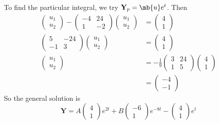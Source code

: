 \documentclass[a4paper]{article}
\begin{document}
\begin{eg}
      To find the particular integral, we try $\mathbf{Y}_p = \mb{u}e^t$. Then
      \begin{align*}
        \begin{pmatrix}
          u_1\\u_2
        \end{pmatrix} - 
        \begin{pmatrix}
          -4 & 24\\
          1 & -2
        \end{pmatrix}
        \begin{pmatrix}
          u_1\\u_2
        \end{pmatrix}&=
        \begin{pmatrix}
          4\\1
        \end{pmatrix}\\
        \begin{pmatrix}
          5 & -24\\
          -1 & 3
        \end{pmatrix}
        \begin{pmatrix}
          u_1\\u_2
        \end{pmatrix}&= 
        \begin{pmatrix}
          4\\1
        \end{pmatrix}\\
        \begin{pmatrix}
          u_1\\u_2
        \end{pmatrix} &= -\frac{1}{9}
        \begin{pmatrix}
          3 & 24\\
          1 & 5
        \end{pmatrix}
        \begin{pmatrix}
          4 \\ 1
        \end{pmatrix}\\
        &= 
        \begin{pmatrix}
          -4\\-1
        \end{pmatrix}
      \end{align*}
      So the general solution is
      \[
        \mathbf{Y} = A
        \begin{pmatrix}
          4\\1
        \end{pmatrix}e^{2t} + B
        \begin{pmatrix}
          -6\\1
        \end{pmatrix}e^{-8t} - 
        \begin{pmatrix}
          4\\1
        \end{pmatrix}e^t
      \]
    \end{eg}
\end{document}
